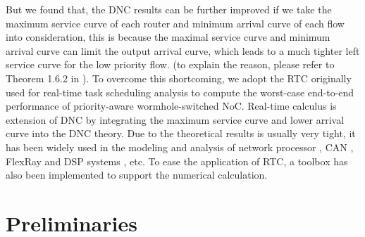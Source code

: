 \documentclass[10pt,journal]{IEEEtran}
\begin{document}
But we found that, the DNC results can be further improved if we take the maximum service curve of each router and minimum arrival curve of each flow into consideration, this is because the maximal service curve and minimum arrival curve can limit the output arrival curve, which leads to a much tighter left service curve for the low priority flow. (to explain the reason, please refer to Theorem 1.6.2 in \cite{Boudec2001Network}). To overcome this shortcoming, we adopt the RTC \cite{ThCN00}\cite{1253607} originally used for real-time task scheduling analysis to compute the worst-case end-to-end performance of priority-aware wormhole-switched NoC. Real-time calculus is extension of DNC by integrating the maximum service curve and lower arrival curve into the DNC theory. Due to the theoretical results is usually very tight, it has been widely used in the modeling and analysis of network processor \cite{1253838}, CAN \cite{4617308}, FlexRay \cite{Chokshi:2010:PAF:1774088.1774162}\cite{Hagiescu:2007:PAF:1278480.1278554} and DSP systems \cite{thiele2005performance}, etc. To ease the application of RTC, a toolbox \cite{rtc} has also been implemented to support the numerical calculation.

\section{Preliminaries}\label{model}
\end{document}
